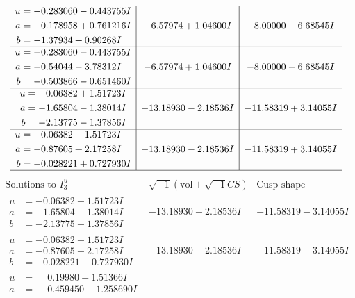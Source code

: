 \documentclass[1p]{elsarticle_modified}
\theoremstyle{definition}
\newcommand{\I}{\sqrt{-1}}
\begin{document}
$$\begin{array}{c|c|c}
\begin{aligned}
u &= -0.283060 - 0.443755 I \\
a &= \phantom{-}0.178958 + 0.761216 I \\
b &= -1.37934 + 0.90268 I\end{aligned}
 & -6.57974 + 1.04600 I & -8.00000 - 6.68545 I \\ \hline\begin{aligned}
u &= -0.283060 - 0.443755 I \\
a &= -0.54044 - 3.78312 I \\
b &= -0.503866 - 0.651460 I\end{aligned}
 & -6.57974 + 1.04600 I & -8.00000 - 6.68545 I \\ \hline\begin{aligned}
u &= -0.06382 + 1.51723 I \\
a &= -1.65804 - 1.38014 I \\
b &= -2.13775 - 1.37856 I\end{aligned}
 & -13.18930 - 2.18536 I & -11.58319 + 3.14055 I \\ \hline\begin{aligned}
u &= -0.06382 + 1.51723 I \\
a &= -0.87605 + 2.17258 I \\
b &= -0.028221 + 0.727930 I\end{aligned}
 & -13.18930 - 2.18536 I & -11.58319 + 3.14055 I\\
 \hline 
 \end{array}$$\newpage$$\begin{array}{c|c|c}  
\text{Solutions to }I^u_{3}& \I (\text{vol} + \sqrt{-1}CS) & \text{Cusp shape}\\
 \hline 
\begin{aligned}
u &= -0.06382 - 1.51723 I \\
a &= -1.65804 + 1.38014 I \\
b &= -2.13775 + 1.37856 I\end{aligned}
 & -13.18930 + 2.18536 I & -11.58319 - 3.14055 I \\ \hline\begin{aligned}
u &= -0.06382 - 1.51723 I \\
a &= -0.87605 - 2.17258 I \\
b &= -0.028221 - 0.727930 I\end{aligned}
 & -13.18930 + 2.18536 I & -11.58319 - 3.14055 I \\ \hline\begin{aligned}
u &= \phantom{-}0.19980 + 1.51366 I \\
a &= \phantom{-}0.459450 - 1.258690 I \\

\end{aligned}
\end{array}$$
\end{document}
